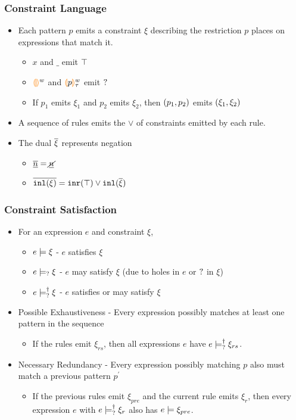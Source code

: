 \documentclass{beamer}
\begin{document}
\begin{frame}
\frametitle{Constraint Language}

\begin{itemize}
\item Each pattern $p$ emits a constraint $\xi$ describing the restriction $p$ places on expressions that match it.
\medskip
\begin{itemize}
	\item $x$ and $\_$ emit $\top$
	\medskip
	\item $\textcolor{orange}{\llparenthesis}\textcolor{orange}{\rrparenthesis}^{w}$ and $\textcolor{orange}{\llparenthesis} p\textcolor{orange}{\rrparenthesis}^{w}_{\tau}$ emit $\mathtt{?}$
	\medskip
	\item If $p_1$ emits $\xi_1$ and $p_2$ emits $\xi_2$, then $(p_1 , p_2)$ emits $(\xi_1 , \xi_2)$
\end{itemize}
\medskip
\item A sequence of rules emits the $\lor$ of constraints emitted by each rule.
\medskip
\item The dual $\overline{\xi}$ represents negation
\medskip
\begin{itemize}
	\item $\overline{\underline{n}} = \underline{\cancel{n}}$
	\medskip
	\item $\overline{\mathtt{inl}(\xi)} = \mathtt{inr}(\top) \vee \mathtt{inl}(\overline{\xi})$
\end{itemize}
\end{itemize}
\end{frame}

\begin{frame}
\frametitle{Constraint Satisfaction}
\begin{itemize}
\item For an expression $e$ and constraint $\xi$,
\begin{itemize}
	\item $e \models \xi$ - $e$ satisfies $\xi$
	\item $e \models_{?} \xi$ - $e$ may satisfy $\xi$ (due to holes in $e$ or $\mathtt{?}$ in $\xi$)
	\item $e \models_{?}^{\dag} \xi$ - $e$ satisfies or may satisfy $\xi$
\end{itemize}
\medskip

\item Possible Exhaustiveness - Every expression possibly matches at least one pattern in the sequence
\begin{itemize}
\item If the rules emit $\xi_{rs}$, then all expressions $e$ have $e \models_{?}^{\dag} \xi_{rs}$.
\end{itemize}
\medskip

\item Necessary Redundancy - Every expression possibly matching $p$ also must match a previous pattern $p^\prime$
\begin{itemize}
	\item If the previous rules emit $\xi_{pre}$ and the current rule emits $\xi_r$, then every expression $e$ with $e \models_{?}^{\dag} \xi_r$ also has $e \models \xi_{pre}$.
\end{itemize}
\end{itemize}
\end{frame}
\end{document}
